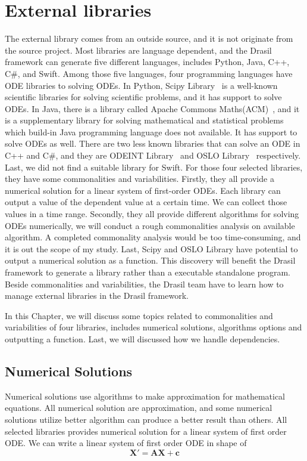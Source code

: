 \chapter{External libraries}
The external library comes from an outside source, and it is not originate from the source project. Most libraries are language dependent, and the Drasil framework can generate five different languages, includes Python, Java, C++, C\#, and Swift. Among those five languages, four programming languages have ODE libraries to solving ODEs. In Python, Scipy Library~\citep{scipy} is a well-known scientific libraries for solving scientific problems, and it has support to solve ODEs. In Java, there is a library called Apache Commons Maths(ACM)~\citep{apache}, and it is a supplementary library for solving mathematical and statistical problems which build-in Java programming language does not available. It has support to solve ODEs as well. There are two less known libraries that can solve an ODE in C++ and C\#, and they are ODEINT Library~\citep{odeint} and OSLO Library~\citep{oslo} respectively. Last, we did not find a suitable library for Swift. For those four selected libraries, they have some commonalities and variabilities. Firstly, they all provide a numerical solution for a linear system of first-order ODEs. Each library can output a value of the dependent value at a certain time. We can collect those values in a time range. Secondly, they all provide different algorithms for solving ODEs numerically, we will conduct a rough commonalities analysis on available algorithm. A completed commonality analysis would be too time-consuming, and it is out the scope of my study. Last, Scipy and OSLO Library have potential to output a numerical solution as a function. This discovery will benefit the Drasil framework to generate a library rather than a executable standalone program. Beside commonalities and variabilities, the Drasil team have to learn how to manage external libraries in the Drasil framework.

In this Chapter, we will discuss some topics related to commonalities and variabilities of four libraries, includes numerical solutions, algorithms options and outputting a function. Last, we will discussed how we handle dependencies.

\section{Numerical Solutions}
Numerical solutions use algorithms to make approximation for mathematical equations. All numerical solution are approximation, and some numerical solutions utilize better algorithm can produce a better result than others. All selected libraries provides numerical solution for a linear system of first order ODE. We can write a linear system of first order ODE in shape of 
\begin{equation} \label{eq_foode}
    \boldsymbol{X}' = \boldsymbol{AX} + \boldsymbol{c}
\end{equation}

